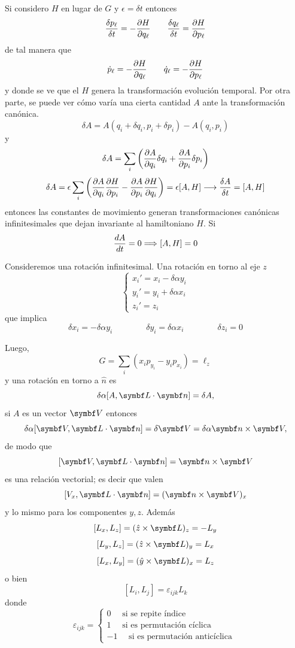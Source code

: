 \documentclass[10pt,oneside]{CBFT_book}
\begin{document}
Si considero $H$ en lugar de $G$ y $\epsilon = \delta t$ entonces
\[
	\frac{\delta p_\ell}{\delta t} = -\frac{\partial^{\hspace{-0.05em}} {H}}{\partial {q_\ell}^{\hspace{-0.05em}}} \qquad \frac{\delta q_\ell}{\delta t} = \frac{\partial^{\hspace{-0.05em}} {H}}{\partial {p_\ell}^{\hspace{-0.05em}}}
\]
de tal manera que 
\[
	\dot{p}_\ell = -\frac{\partial^{\hspace{-0.05em}} {H}}{\partial {q_\ell}^{\hspace{-0.05em}}} \qquad \dot{q}_\ell = -\frac{\partial^{\hspace{-0.05em}} {H}}{\partial {p_\ell}^{\hspace{-0.05em}}}
\]
y donde se ve que el $H$ genera la transformación evolución temporal.
Por otra parte, se puede ver cómo varía una cierta cantidad $A$ ante la transformación canónica.
\[
	\delta A = A(q_i + \delta q_i, p_i + \delta p_i) - A(q_i,p_i)
\]
y
\[
	\delta A = \sum_i \left( \frac{\partial^{\hspace{-0.05em}} {A}}{\partial {q_i}^{\hspace{-0.05em}}} \delta q_i + \frac{\partial^{\hspace{-0.05em}} {A}}{\partial {p_i}^{\hspace{-0.05em}}} \delta p_i \right)
\]
\[
	\delta A = \epsilon \sum_i \left( \frac{\partial^{\hspace{-0.05em}} {A}}{\partial {q_i}^{\hspace{-0.05em}}} \frac{\partial^{\hspace{-0.05em}} {H}}{\partial {p_i}^{\hspace{-0.05em}}} - \frac{\partial^{\hspace{-0.05em}} {A}}{\partial {p_i}^{\hspace{-0.05em}}} \frac{\partial^{\hspace{-0.05em}} {H}}{\partial {q_i}^{\hspace{-0.05em}}} \right) =
	\epsilon[A,H] \longrightarrow \frac{\delta A}{\delta t} = [A,H]
\]
entonces las constantes de movimiento generan transformaciones canónicas infinitesimales que dejan invariante
al hamiltoniano $H$. Si
\[
	\frac{d^{\hspace{-0.05em}} {A}}{d {t}^{\hspace{-0.05em}}} = 0 \Longrightarrow [A,H] = 0
\]

Consideremos una rotación infinitesimal. Una rotación en torno al eje $z$
\[
	\begin{cases}
		x_i' = x_i - \delta \alpha y_i \\
		y_i' = y_i + \delta \alpha x_i \\
		z_i' = z_i
	\end{cases}
\]
que implica 
\[
	\delta x_i = -  \delta \alpha y_i \qquad \qquad \delta y_i = \delta \alpha x_i \qquad \qquad 
	\delta z_i = 0
\]

Luego,
\[
	G = \sum_i ( x_i p_{y_i} - y_i p_{x_i} ) = \ell_z
\]
y una rotación en torno a $\hat{n}$ es
\[
	\delta\alpha [ A, \vb{L}\cdot\vb{n} ] = \delta A,
\]
si $A$ es un vector $\vb{V}$ entonces
\[
	\delta\alpha [ \vb{V}, \vb{L}\cdot\vb{n} ] = \delta \vb{V} = \delta\alpha \vb{n} \times \vb{V},
\]
de modo que 
\[
	[ \vb{V}, \vb{L}\cdot\vb{n} ] = \vb{n} \times \vb{V}
\]
es una relación vectorial; es decir que valen
\[
	[ V_x, \vb{L}\cdot\vb{n} ] = (\vb{n} \times \vb{V})_x
\]
y lo mismo para los componentes $y,z$. Además
\[
	[L_x, L_z] = ( \hat{z} \times \vb{L} )_z = - L_y
\]
\[
	[L_y, L_z] = ( \hat{z} \times \vb{L} )_y = L_x
\]
\[
	[L_x, L_y] = ( \hat{y} \times \vb{L} )_x = L_z
\]
o bien 
\[
	[L_i, L_j] = \varepsilon_{ijk} L_k
\]
donde 
\[
	\varepsilon_{ijk} = \begin{cases}
	 0 \quad \text{ si se repite índice } \\
	 1 \quad \text{ si es permutación cíclica } \\
	 -1 \quad \text{ si es permutación anticíclica }
	\end{cases}
\]
\end{document}
